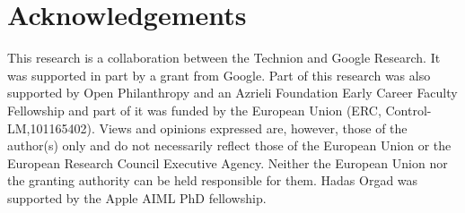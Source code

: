 \section{Acknowledgements}
This research is a collaboration between the Technion and Google Research. It was supported in part by a grant from Google.
Part of this research was also supported by Open Philanthropy and an Azrieli Foundation Early Career Faculty Fellowship and part of it was funded by the European Union (ERC, Control-LM,101165402). Views and opinions expressed are, however, those of the author(s) only and do not necessarily reflect those of the European Union or the European Research Council Executive Agency. Neither the European Union nor the granting authority can be held responsible for them.
Hadas Orgad was supported by the Apple AIML PhD fellowship.
